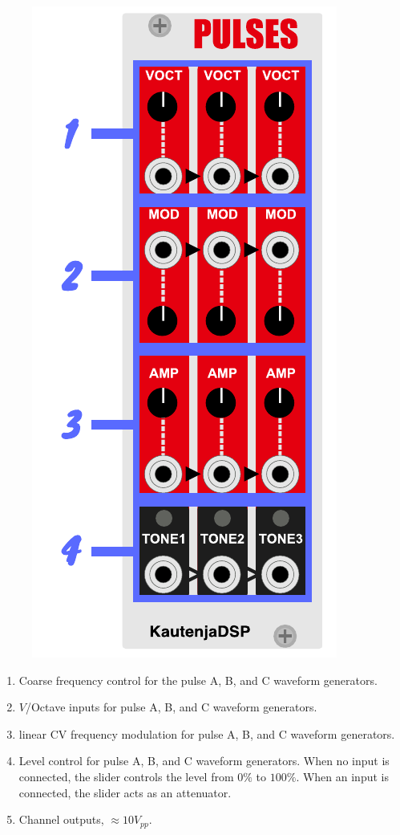 \documentclass[12pt,letter]{article}
\begin{document}
\begin{figure}[!htp]
\centering
\includegraphics{Interface}
\end{figure}

\begin{enumerate}
  \item Coarse frequency control for the pulse A, B, and C waveform generators.
  \item $V$/Octave inputs for pulse A, B, and C waveform generators.
  \item linear CV frequency modulation for pulse A, B, and C waveform generators.
  \item Level control for pulse A, B, and C waveform generators. When no input is connected, the slider controls the level from $0\%$ to $100\%$. When an input is connected, the slider acts as an attenuator.
  \item Channel outputs, ${\approx}10V_{pp}$.
\end{enumerate}


\clearpage
\renewcommand\refname{References \& Acknowledgments}
\nocite{*}


\end{document}
